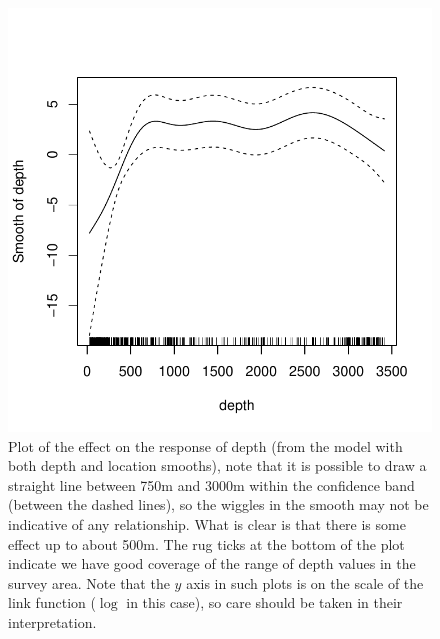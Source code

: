 \documentclass[a4paper,12pt]{article}
\begin{document}
\begin{figure}[h!]
  \caption{Plot of the effect on the response of depth (from the model with both depth and location smooths), note that it is possible to draw a straight line between 750m and 3000m within the confidence band (between the dashed lines), so the wiggles in the smooth may not be indicative of any relationship. What is clear is that there is some effect up to about 500m. The rug ticks at the bottom of the plot indicate we have good coverage of the range of depth values in the survey area. Note that the $y$ axis in such plots is on the scale of the link function ($\log$ in this case), so care should be taken in their interpretation.}
  \label{depth-gamplot}
  \begin{center}
    \includegraphics[width=\textwidth]{figs/fit-depth-gam}
  \end{center}
\end{figure}

\newpage
\end{document}
